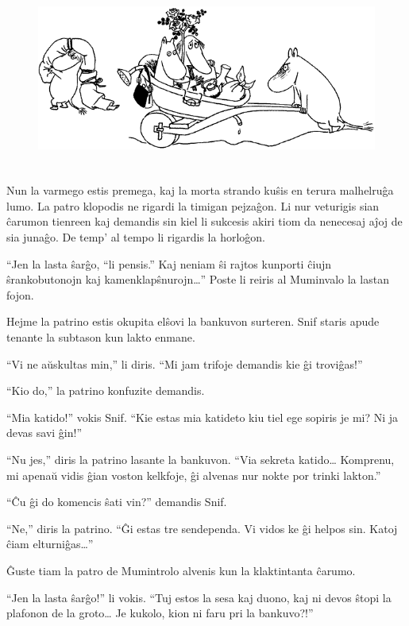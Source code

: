 \begin{figure}[htbp]
\centering
\includegraphics[width=400pt,height=170pt]{9-4.png}
\caption{}
\label{9-4}
\end{figure}

Nun la varmego estis premega, kaj la morta strando kuŝis en terura malhelruĝa lumo. La patro klopodis ne rigardi la timigan pejzaĝon. Li nur veturigis sian ĉarumon tienreen kaj demandis sin kiel li sukcesis akiri tiom da nenecesaj aĵoj de sia junaĝo. De temp' al tempo li rigardis la horloĝon.

``Jen la lasta ŝarĝo, ``li pensis.'' Kaj neniam ŝi rajtos kunporti ĉiujn ŝrankobutonojn kaj kamenklapŝnurojn{\ldots}'' Poste li reiris al Muminvalo la lastan fojon.

\sectionbreak

Hejme la patrino estis okupita elŝovi la bankuvon surteren. Snif staris apude tenante la subtason kun lakto enmane.

``Vi ne aŭskultas min,'' li diris. ``Mi jam trifoje demandis kie ĝi troviĝas!''

``Kio do,'' la patrino konfuzite demandis.

``Mia katido!'' vokis Snif. ``Kie estas mia katideto kiu tiel ege sopiris je mi? Ni ja devas savi ĝin!''

``Nu jes,'' diris la patrino lasante la bankuvon. ``Via sekreta katido{\ldots} Komprenu, mi apenaŭ vidis ĝian voston kelkfoje, ĝi alvenas nur nokte por trinki lakton.''

``Ĉu ĝi do komencis ŝati vin?'' demandis Snif.

``Ne,'' diris la patrino. ``Ĝi estas tre sendependa. Vi vidos ke ĝi helpos sin. Katoj ĉiam elturniĝas{\ldots}''

Ĝuste tiam la patro de Mumintrolo alvenis kun la klaktintanta ĉarumo.

``Jen la lasta ŝarĝo!'' li vokis. ``Tuj estos la sesa kaj duono, kaj ni devos ŝtopi la plafonon de la groto{\ldots} Je kukolo, kion ni faru pri la bankuvo?!''

